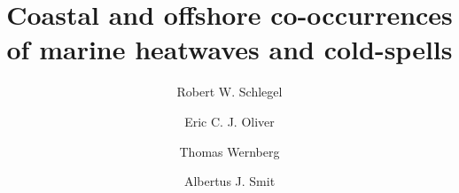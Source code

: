 \documentclass[a4paper,10pt,review]{elsarticle}
\begin{document}
\begin{frontmatter}

\title{Coastal and offshore co-occurrences of marine heatwaves and cold-spells}

\author[firstaddress]{Robert W. Schlegel}
\author[secondaddress,thirdaddress]{Eric C. J. Oliver}
\author[fourthaddress]{Thomas Wernberg}
\author[firstaddress]{Albertus J. Smit}



\address[firstaddress]{Department of Biodiversity and Conservation Biology, University of the Western Cape, Private Bag X17, Bellville 7535, South Africa}

\address[secondaddress]{ARC Centre of Excellence for Climate System Science, Australia}

\address[thirdaddress]{Institute for Marine and Antarctic Studies, University of Tasmania, Hobart, Australia}

\address[fourthaddress]{UWA Oceans Institute and School of Plant Biology, The University of Western Australia, Crawley, 6009 Western Australia, Australia}


\end{frontmatter}
\end{document}
